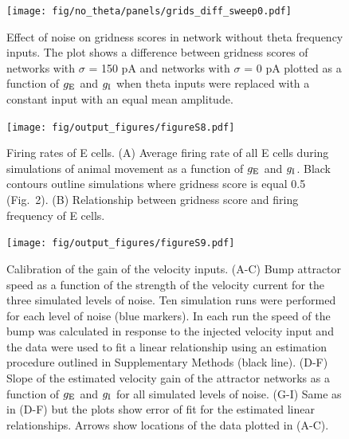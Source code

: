 \documentclass[a4paper,12pt]{article}
\newcommand{\ssc}[3]{\ensuremath{#1_{\text{#2}_{\text{#3}}}}}
\newcommand{\gE      }{\ssc{g}      {\scriptsize{E}}{}}
\newcommand{\gI      }{\ssc{g}      {\scriptsize{I}}{}}
\begin{document}
\clearpage

\begin{figure}[ht!]
    \internallinenumbers
    \centering
        \texttt{[image: fig/no\_theta/panels/grids\_diff\_sweep0.pdf]}
    \caption{Effect of noise on gridness scores in network without theta
    frequency inputs. The plot shows a difference between gridness scores
    of networks with $\sigma$ = 150 pA and networks with $\sigma$ = 0 pA
    plotted as a function of $\gE$ and $\gI$ when theta inputs were replaced
    with a constant input with an equal mean amplitude.}
\end{figure}

\clearpage

\begin{figure}[ht!]
    \internallinenumbers
    \centering
        \texttt{[image: fig/output\_figures/figureS8.pdf]}
    \caption{Firing rates of E cells. (A) Average firing rate of all E cells
    during simulations of animal movement as a function of $\gE$ and $\gI$.
    Black contours outline simulations where gridness score is equal 0.5
    (Fig.~2). (B) Relationship between gridness score and firing frequency of
    E cells.}
\end{figure}

\clearpage

\begin{figure}[ht!]
    \internallinenumbers
    \centering
        \texttt{[image: fig/output\_figures/figureS9.pdf]}
    \caption{Calibration of the gain of the velocity inputs. (A-C) Bump
    attractor speed as a function of the strength of the velocity current for
    the three simulated levels of noise. Ten simulation runs were performed for
    each level of noise (blue markers). In each run the speed of the bump was
    calculated in response to the injected velocity input and the data were
    used to fit a linear relationship using an estimation procedure outlined
    in Supplementary Methods (black line). (D-F) Slope of the estimated velocity gain of
    the attractor networks as a function of $\gE$ and $\gI$ for all simulated
    levels of noise. (G-I) Same as in (D-F) but the plots show error of fit
    for the estimated linear relationships. Arrows show locations of the data
    plotted in (A-C).}
\end{figure}

\clearpage
\end{document}
